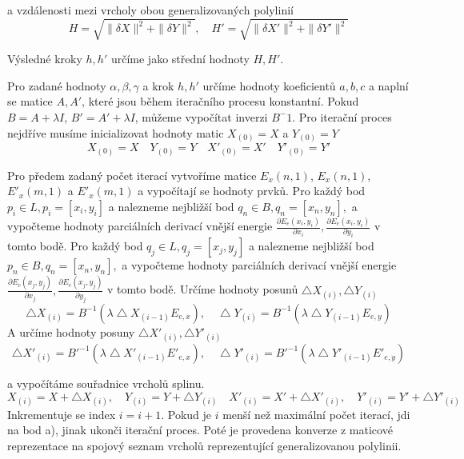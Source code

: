 \documentclass[oneside,12pt,a4paper]{book}
\begin{document}
a vzdálenosti mezi vrcholy obou generalizovaných polylinií
 \begin{equation}
H = \sqrt{ \| \delta X\|^2 +\| \delta Y\|^2}, \quad H' = \sqrt{ \| \delta X'\|^2 +\| \delta Y'\|^2}
\end{equation}

Výsledné kroky $h, h'$ určíme jako střední hodnoty $H,H'$.

Pro zadané hodnoty $\alpha ,\beta ,\gamma $ a krok $h, h'$ 
určíme hodnoty koeficientů $a, b, c$ a naplní se matice $A, A'$, 
které jsou během iteračního procesu konstantní. Pokud 
$B = A+ \lambda I$, $B' = A'+ \lambda I$, můžeme vypočítat inverzi $B^-1$.
Pro iterační proces nejdříve musíme inicializovat hodnoty matic 
$X_{(0)} = X$ a $Y_{(0)} = Y$
\begin{equation}
X_{(0)} = X \quad Y_{(0)} = Y \quad X'_{(0)} = X' \quad Y'_{(0)} = Y'
\end{equation}

Pro předem zadaný počet iterací vytvoříme matice  $E_x(n,1)$, $E_x(n,1)$, $E'_x(m,1)$ a $E'_x(m,1)$ a vypočítají se hodnoty prvků.
Pro každý bod $p_i \in L, p_i = [x_i,y_i]$ a nalezneme nejbližší bod $q_n \in B, q_n = [x_n,y_n],$ a vypočteme hodnoty parciálních derivací vnější energie  $\frac{\partial E_e(x_i,y_i)}{\partial x_i}, 
\frac{\partial E_e(x_i,y_i)}{\partial y_i}  $
v tomto bodě.
Pro každý bod $q_j \in L, q_j = [x_j,y_j]$ a nalezneme nejbližší bod $p_n \in B, q_n = [x_n,y_n],$ a vypočteme hodnoty parciálních derivací vnější energie  $\frac{\partial E_e(x_j,y_j)}{\partial x_j}, 
\frac{\partial E_e(x_j,y_j)}{\partial y_j}  $
v tomto bodě. Určíme hodnoty posunů $\bigtriangleup X_{(i)}, \bigtriangleup Y_{(i)}$
 \begin{equation}
\bigtriangleup X_{(i)} = B^{-1}(\lambda \bigtriangleup X_{(i-1)} E_{e,x}), 
\quad 
\bigtriangleup Y_{(i)} = B^{-1}(\lambda \bigtriangleup Y_{(i-1)}E_{e,y})
\end{equation}
A určíme hodnoty posuny $\bigtriangleup X'_{(i)}, \bigtriangleup Y'_{(i)}$
 \begin{equation}
\bigtriangleup X'_{(i)} = B'^{-1}(\lambda \bigtriangleup X'_{(i-1)} E'_{e,x}), 
\quad 
\bigtriangleup Y'_{(i)} = B'^{-1}(\lambda \bigtriangleup Y'_{(i-1)}E'_{e,y})
\end{equation}

a vypočítáme souřadnice vrcholů splinu.
 \begin{equation}
 X_{(i)} = X + \bigtriangleup X_{(i)},
\quad 
 Y_{(i)} = Y + \bigtriangleup Y_{(i)}
 \quad 
 X'_{(i)} = X' + \bigtriangleup X'_{(i)},
\quad 
 Y'_{(i)} = Y' + \bigtriangleup Y'_{(i)}
\end{equation}
Inkrementuje se index $i = i+1$. Pokud je $i$ menší než maximální počet iterací, jdi na bod a), jinak ukonči iterační proces. Poté je provedena konverze z maticové reprezentace na spojový seznam vrcholů reprezentující generalizovanou polylinii. 
\end{document}
